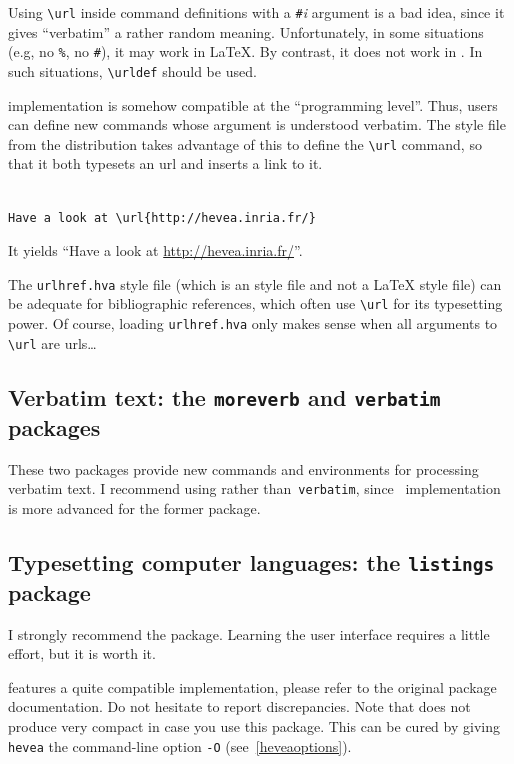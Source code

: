 Using \verb+\url+ inside command definitions with a
\verb+#+\textit{i} argument is a bad idea, since
it gives ``verbatim'' a rather random meaning.
Unfortunately, in some situations (e.g, no \verb+%+, no \verb+#+),
it may work in \LaTeX{}. By
contrast, it does not work in \hevea{}. In such situations,
\verb+\urldef+ should be used.

\hevea{} implementation is somehow compatible at the ``programming level''.
Thus, users can define new commands whose argument is understood
verbatim. The  style file
from the distribution
takes advantage of this to define the \verb+\url+ command, so that it both
typesets an url and inserts a link to it.
\begin{htmlonly}
\begin{verbatim}

Have a look at \url{http://hevea.inria.fr/}
\end{verbatim}
It yields ``Have a look at \url{http://hevea.inria.fr/}''.
\end{htmlonly}
The \texttt{urlhref.hva}
style file (which is an \hevea{} style file and not a \LaTeX{}
style file) can be adequate for bibliographic references,
which often use \verb+\url+ for its typesetting power.
Of course, loading \texttt{urlhref.hva} only makes sense when
all arguments to \verb+\url+ are urls\ldots

\subsection{Verbatim text: the \texttt{moreverb} and
\texttt{verbatim} packages}
These two packages provide new commands and environments for
processing verbatim text.
I recommend using
rather than~\texttt{verbatim},
since \hevea{}~implementation is more advanced for the former package.



\subsection{Typesetting \label{listings:package}computer languages: the \texttt{listings} package}
%
I strongly recommend the
 package.
Learning the user interface requires a little effort, but it is worth
it.

\hevea{} features a quite compatible implementation, please refer to
the original package documentation.
Do not hesitate to report discrepancies.
Note that \hevea{} does not produce very compact
\html{} in case you use this package.
This can be cured by
giving \texttt{hevea} the command-line option \texttt{-O}
(see~\ref{heveaoptions}).


